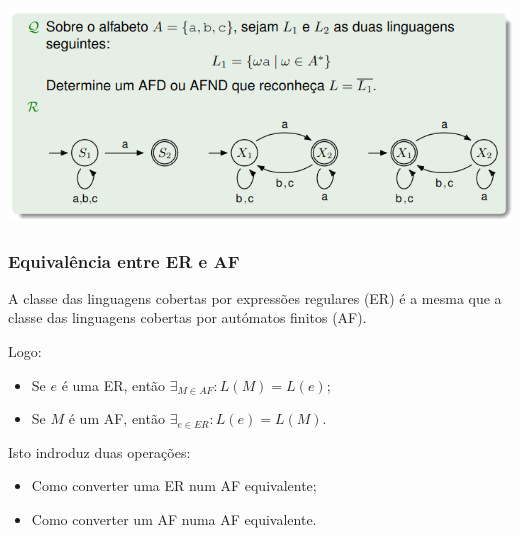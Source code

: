 \documentclass{article}
\begin{document}
\begin{flushleft}
\begin{center}
    \begin{center}
      \includegraphics[scale=0.4]{74}
    \end{center}
  \end{center}

\end{flushleft}

\subsubsection{Equivalência entre ER e AF}

\begin{flushleft}
  \item A classe das linguagens cobertas por expressões regulares (ER) é a mesma que
  a classe das linguagens cobertas por autómatos finitos (AF).
  \item Logo:
  \begin{itemize}
    \item Se $e$ é uma ER, então $\exists_{M \in AF} : L(M) = L(e)$;
    \item Se $M$ é um AF, então $\exists_{e \in ER} : L(e) = L(M)$.
  \end{itemize}
  \item Isto indroduz duas operações:
  \begin{itemize}
    \item Como converter uma ER num AF equivalente;
    \item Como converter um AF numa AF equivalente.
  \end{itemize}
\end{flushleft}
\end{document}
